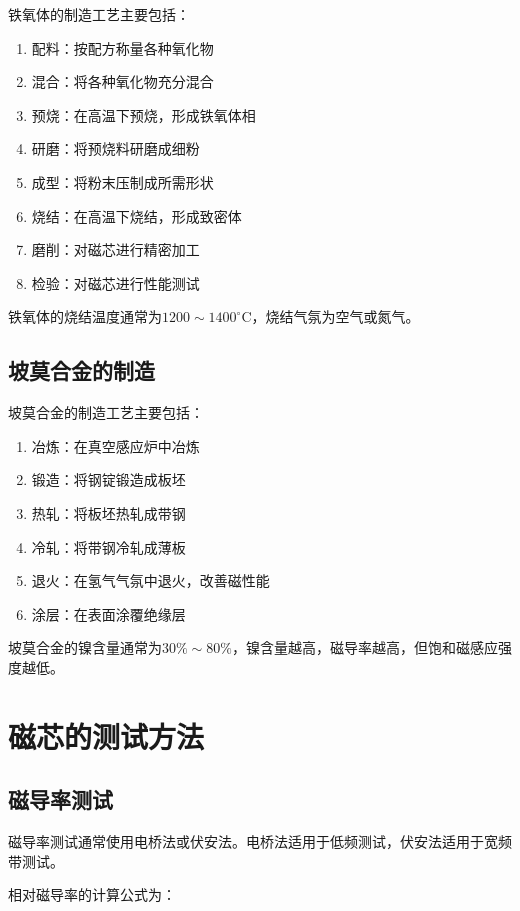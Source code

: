 \documentclass[12pt,UTF8]{ctexbook}
\begin{document}
铁氧体的制造工艺主要包括：

\begin{enumerate}[leftmargin=2cm]
    \item 配料：按配方称量各种氧化物
    \item 混合：将各种氧化物充分混合
    \item 预烧：在高温下预烧，形成铁氧体相
    \item 研磨：将预烧料研磨成细粉
    \item 成型：将粉末压制成所需形状
    \item 烧结：在高温下烧结，形成致密体
    \item 磨削：对磁芯进行精密加工
    \item 检验：对磁芯进行性能测试
\end{enumerate}

铁氧体的烧结温度通常为$1200 \sim 1400^\circ$C，烧结气氛为空气或氮气。

\subsection{坡莫合金的制造}

坡莫合金的制造工艺主要包括：

\begin{enumerate}[leftmargin=2cm]
    \item 冶炼：在真空感应炉中冶炼
    \item 锻造：将钢锭锻造成板坯
    \item 热轧：将板坯热轧成带钢
    \item 冷轧：将带钢冷轧成薄板
    \item 退火：在氢气气氛中退火，改善磁性能
    \item 涂层：在表面涂覆绝缘层
\end{enumerate}

坡莫合金的镍含量通常为$30\% \sim 80\%$，镍含量越高，磁导率越高，但饱和磁感应强度越低。

\section{磁芯的测试方法}

\subsection{磁导率测试}

磁导率测试通常使用电桥法或伏安法。电桥法适用于低频测试，伏安法适用于宽频带测试。

相对磁导率的计算公式为：
\end{document}
